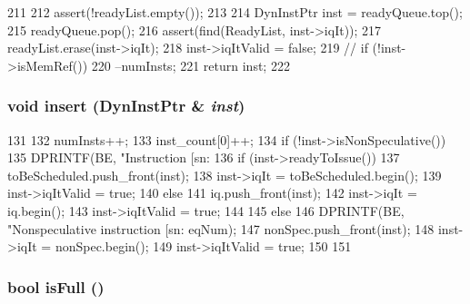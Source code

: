 \begin{DoxyCode}
211 {
212     assert(!readyList.empty());
213 
214     DynInstPtr inst = readyQueue.top();
215     readyQueue.pop();
216     assert(find(ReadyList, inst->iqIt));
217     readyList.erase(inst->iqIt);
218     inst->iqItValid = false;
219 //    if (!inst->isMemRef())
220         --numInsts;
221     return inst;
222 }
\end{DoxyCode}
\hypertarget{classBackEnd_1_1InstQueue_a773e88db1aa010c3755e603493bf40ec}{
\subsubsection[{insert}]{\setlength{\rightskip}{0pt plus 5cm}void insert ({\bf DynInstPtr} \& {\em inst})}}
\label{classBackEnd_1_1InstQueue_a773e88db1aa010c3755e603493bf40ec}



\begin{DoxyCode}
131 {
132     numInsts++;
133     inst_count[0]++;
134     if (!inst->isNonSpeculative()) {
135         DPRINTF(BE, "Instruction [sn:%
136         if (inst->readyToIssue()) {
137             toBeScheduled.push_front(inst);
138             inst->iqIt = toBeScheduled.begin();
139             inst->iqItValid = true;
140         } else {
141             iq.push_front(inst);
142             inst->iqIt = iq.begin();
143             inst->iqItValid = true;
144         }
145     } else {
146         DPRINTF(BE, "Nonspeculative instruction [sn:%
      eqNum);
147         nonSpec.push_front(inst);
148         inst->iqIt = nonSpec.begin();
149         inst->iqItValid = true;
150     }
151 }
\end{DoxyCode}
\hypertarget{classBackEnd_1_1InstQueue_a3e70330939fdfc4dbc2f60c1a660584d}{
\subsubsection[{isFull}]{\setlength{\rightskip}{0pt plus 5cm}bool isFull ()}}
\label{classBackEnd_1_1InstQueue_a3e70330939fdfc4dbc2f60c1a660584d}



